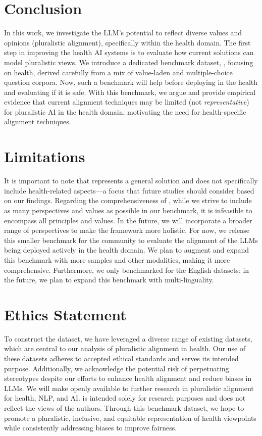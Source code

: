 \section{Conclusion}



In this work, we investigate the LLM's potential to reflect diverse values and opinions (\aka pluralistic alignment), specifically within the health domain. The first step in improving the health AI systems is to evaluate how current solutions can model pluralistic views. We introduce a dedicated benchmark dataset, \ourdataset, focusing on health, derived carefully from a mix of value-laden and multiple-choice question corpora. Now, such a benchmark will help before deploying in the health and evaluating if it is safe. With this benchmark, we argue and provide empirical evidence that current alignment techniques may be limited (not \textit{representative}) for pluralistic AI in the health domain, motivating the need for health-specific alignment techniques.


\section*{Limitations}
It is important to note that \modplural represents a general solution and does not specifically include health-related aspects—a focus that future studies should consider based on our findings.
Regarding the comprehensiveness of \ourdataset, while we strive to include as many perspectives and values as possible in our benchmark, it is infeasible to encompass all principles and values. In the future, we will incorporate a broader range of perspectives to make the framework more holistic. For now, we release this smaller benchmark for the community to evaluate the alignment of the LLMs being deployed actively in the health domain. We plan to augment and expand this benchmark with more samples and other modalities, making it more comprehensive. Furthermore, we only benchmarked for the English datasets; in the future, we plan to expand this benchmark with multi-linguality.


\section*{Ethics Statement}
To construct the \ourdataset dataset, we have leveraged a diverse range of existing datasets, which are central to our analysis of pluralistic alignment in health. Our use of these datasets adheres to accepted ethical standards and serves its intended purpose. Additionally, we acknowledge the potential risk of perpetuating stereotypes despite our efforts to enhance health alignment and reduce biases in LLMs. We will make \ourdataset openly available to further research in pluralistic alignment for health, NLP, and AI. \ourdataset is intended solely for research purposes and does not reflect the views of the authors. Through this benchmark dataset, we hope to promote a pluralistic, inclusive, and equitable representation of health viewpoints while consistently addressing biases to improve fairness.

